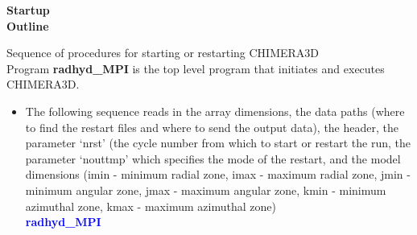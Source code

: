 \documentclass[11pt,doublespace]{article}
\begin{document}
\begin{center}
{\large {\bf Startup\\
Outline}}
\end{center}

\bigskip
{\LARGE Sequence of procedures for starting or restarting CHIMERA3D} \\

Program {\bf radhyd\_MPI} is the top level program that initiates and executes CHIMERA3D.

\begin{itemize}
   
  \item The following sequence reads in the array dimensions, the data paths (where to find the restart files and where to send the output data), the header, the parameter `nrst' (the cycle number from which to start or restart the run, the parameter `nouttmp' which specifies the mode of the restart, and the model dimensions (imin  - minimum radial zone, imax - maximum radial zone,  jmin - minimum angular zone, jmax - maximum angular zone, kmin - minimum azimuthal zone, kmax - maximum azimuthal zone)\\


  \textcolor{blue}{ {\bf radhyd\_MPI} }


\end{itemize}
\end{document}
